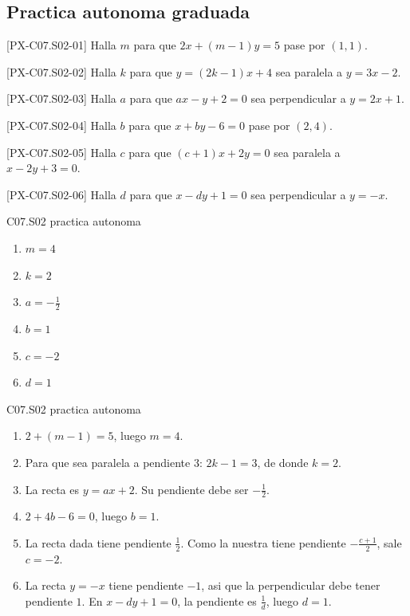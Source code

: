 \subsection*{Practica autonoma graduada}
\begin{exercise}{[PX-C07.S02-01] Halla \(m\) para que \(2x+(m-1)y=5\) pase por \((1,1)\).}
\end{exercise}
\begin{exercise}{[PX-C07.S02-02] Halla \(k\) para que \(y=(2k-1)x+4\) sea paralela a \(y=3x-2\).}
\end{exercise}
\begin{exercise}{[PX-C07.S02-03] Halla \(a\) para que \(ax-y+2=0\) sea perpendicular a \(y=2x+1\).}
\end{exercise}
\begin{exercise}{[PX-C07.S02-04] Halla \(b\) para que \(x+by-6=0\) pase por \((2,4)\).}
\end{exercise}
\begin{exercise}{[PX-C07.S02-05] Halla \(c\) para que \((c+1)x+2y=0\) sea paralela a \(x-2y+3=0\).}
\end{exercise}
\begin{exercise}{[PX-C07.S02-06] Halla \(d\) para que \(x-dy+1=0\) sea perpendicular a \(y=-x\).}
\end{exercise}

\begin{shortanswer}{C07.S02 practica autonoma}
\begin{enumerate}[label=\textbf{PX-C07.S02-\arabic*:}, leftmargin=*]
  \item \(m=4\)
  \item \(k=2\)
  \item \(a=-\frac{1}{2}\)
  \item \(b=1\)
  \item \(c=-2\)
  \item \(d=1\)
\end{enumerate}
\end{shortanswer}

\begin{fullsolution}{C07.S02 practica autonoma}
\begin{enumerate}[label=\textbf{PX-C07.S02-\arabic*:}, leftmargin=*]
  \item \(2+(m-1)=5\), luego \(m=4\).
  \item Para que sea paralela a pendiente \(3\): \(2k-1=3\), de donde \(k=2\).
  \item La recta es \(y=ax+2\). Su pendiente debe ser \(-\frac{1}{2}\).
  \item \(2+4b-6=0\), luego \(b=1\).
  \item La recta dada tiene pendiente \(\frac{1}{2}\). Como la nuestra tiene pendiente
  \(-\frac{c+1}{2}\), sale \(c=-2\).
  \item La recta \(y=-x\) tiene pendiente \(-1\), asi que la perpendicular debe tener pendiente
  \(1\). En \(x-dy+1=0\), la pendiente es \(\frac{1}{d}\), luego \(d=1\).
\end{enumerate}
\end{fullsolution}

